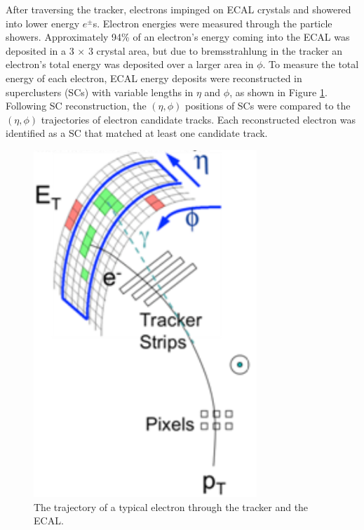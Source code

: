 After traversing the tracker, electrons impinged on ECAL crystals and showered into lower energy $e^{\pm}$s.  
Electron energies were measured through the particle showers.  Approximately 94\% of an electron's energy coming 
into the ECAL was deposited in a 3 $\times$ 3 crystal area, but due to bremsstrahlung in the tracker an electron's 
total energy was deposited over a larger area in $\phi$.  To measure the total energy of each electron, ECAL energy 
deposits were reconstructed in superclusters (SCs) with variable lengths in $\eta$ and $\phi$, as shown in Figure 
\ref{fig:eleTrackAndSC}.  Following SC reconstruction, the $(\eta, \phi)$ positions of SCs were compared to the 
$(\eta, \phi)$ trajectories of electron candidate tracks.  Each reconstructed electron was identified as a SC that 
matched at least one candidate track.

\begin{figure}[h]
	\centering
	\includegraphics[width=0.75\textwidth]{figures/electronTrackAndSupercluster.png}
	\caption{The trajectory of a typical electron through the tracker and the ECAL.}
	\label{fig:eleTrackAndSC}
\end{figure}


